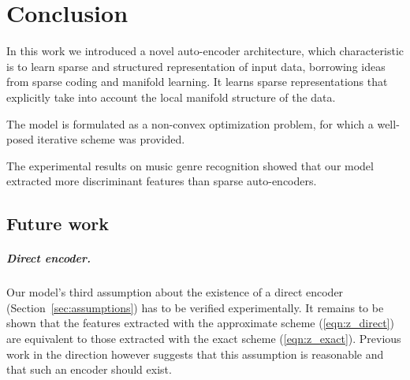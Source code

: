 \documentclass[a4paper,12pt,oneside]{report}
\newcommand{\secref}[1]{Section~\ref{sec:#1}}
\newcommand{\eqnref}[1]{(\ref{eqn:#1})}  %
\begin{document}
\chapter*{Conclusion}

In this work we introduced a novel auto-encoder architecture, which characteristic is to learn sparse and structured representation of input data, borrowing ideas from sparse coding and manifold learning. It learns sparse representations that explicitly take into account the local manifold structure of the data.

The model is formulated as a non-convex optimization problem, for which a well-posed iterative scheme was provided.

The experimental results on music genre recognition showed that our model extracted more discriminant features than sparse auto-encoders.

\section*{Future work}

\paragraph{Direct encoder.}
Our model's third assumption about the existence of a direct encoder (\secref{assumptions}) has to be verified experimentally. It remains to be shown that the features extracted with the approximate scheme \eqnref{z_direct} are equivalent to those extracted with the exact scheme \eqnref{z_exact}. Previous work in the direction however suggests that this assumption is reasonable and that such an encoder should exist.


\end{document}
